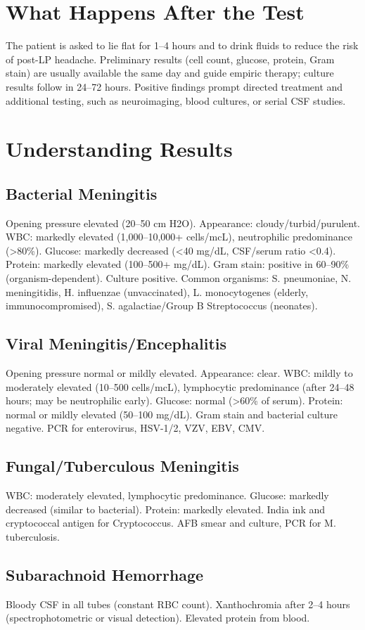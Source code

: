 \section*{What Happens After the Test}
The patient is asked to lie flat for 1--4 hours and to drink fluids to reduce the risk of post-LP headache. Preliminary results (cell count, glucose, protein, Gram stain) are usually available the same day and guide empiric therapy; culture results follow in 24--72 hours. Positive findings prompt directed treatment and additional testing, such as neuroimaging, blood cultures, or serial CSF studies.
\section*{Understanding Results}
\subsection*{Bacterial Meningitis}
Opening pressure elevated (20--50 cm H2O). Appearance: cloudy/turbid/purulent. WBC: markedly elevated (1,000--10,000+ cells/mcL), neutrophilic predominance (>80\%). Glucose: markedly decreased (<40 mg/dL, CSF/serum ratio <0.4). Protein: markedly elevated (100--500+ mg/dL). Gram stain: positive in 60--90\% (organism-dependent). Culture positive. Common organisms: S. pneumoniae, N. meningitidis, H. influenzae (unvaccinated), L. monocytogenes (elderly, immunocompromised), S. agalactiae/Group B Streptococcus (neonates).
\subsection*{Viral Meningitis/Encephalitis}
Opening pressure normal or mildly elevated. Appearance: clear. WBC: mildly to moderately elevated (10--500 cells/mcL), lymphocytic predominance (after 24--48 hours; may be neutrophilic early). Glucose: normal (>60\% of serum). Protein: normal or mildly elevated (50--100 mg/dL). Gram stain and bacterial culture negative. PCR for enterovirus, HSV-1/2, VZV, EBV, CMV.
\subsection*{Fungal/Tuberculous Meningitis}
WBC: moderately elevated, lymphocytic predominance. Glucose: markedly decreased (similar to bacterial). Protein: markedly elevated. India ink and cryptococcal antigen for Cryptococcus. AFB smear and culture, PCR for M. tuberculosis.
\subsection*{Subarachnoid Hemorrhage}
Bloody CSF in all tubes (constant RBC count). Xanthochromia after 2--4 hours (spectrophotometric or visual detection). Elevated protein from blood.
